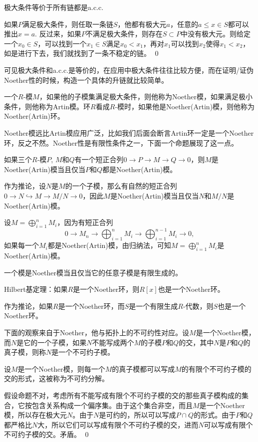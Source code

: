 \pro 极大条件等价于所有链都是a.c.c.

\proof
	如果$P$满足极大条件，则任取一条链$S$，他都有极大元$a$，任意的$a\leq x\in S$都可以推出$x=a$. 反过来，如果$P$不满足极大条件，则存在$S\subset P$中没有极大元。则给定一个$x_0\in S$，可以找到一个$x_1\in S$满足$x_0<x_1$，再对$x_1$可以找到$x_2$使得$x_1<x_2$，如是进行下去，我们就找到了一条不稳定的链。
\qed

可见极大条件和a.c.c.是等价的，在应用中极大条件往往比较方便，而在证明/证伪Noether性的时候，构造一个具体的升链就比较简单。

\para 一个$R$-模$M$，如果他的子模集满足极大条件，则他称为Noether模，如果满足极小条件，则他称为Artin模。环$R$看成$R$-模时，如果他是Noether(Artin)模，则他称为Noether(Artin)环。

Noether模远比Artin模应用广泛，比如我们后面会断言Artin环一定是一个Noether环，反之不然。Noether性是有限性条件之一，下面一个命题展现了这一点。

\pro 如果三个$R$-模$P$, $M$和$Q$有一个短正合列$0\to P\to M\to Q\to 0$，则$M$是Noether(Artin)模当且仅当$P$和$Q$都是Noether(Artin)模。\notprove

作为推论，设$N$是$M$的一个子模，那么有自然的短正合列$0\to N\hookrightarrow M\to M/N\to 0$，因此$M$是Noether(Artin)模当且仅当$N$和$M/N$是Noether(Artin)模。

设$M=\bigoplus_{i=1}^nM_i$，因为有短正合列
\[
	0\to M_n\to \bigoplus_{i=1}^nM_i\to \bigoplus_{i=1}^{n-1}M_i\to 0,
\]
如果每一个$M_i$都是Noether(Artin)模，由归纳法，可知$M=\bigoplus_{i=1}^nM_i$是Noether(Artin)模。

\pro 一个模是Noether模当且仅当它的任意子模是有限生成的。\notprove

\theo Hilbert基定理：如果$R$是一个Noether环，则$R[x]$也是一个Noether环。\notprove

作为推论，如果$R$是一个Noether环，而$S$是一个有限生成$R$-代数，则$S$也是一个Noether环。

\para 下面的观察来自于Noether，他与拓扑上的不可约性对应。设$M$是一个Noether模，而$N$是它的一个子模，如果$N$不能写成两个$M$的子模$P$和$Q$的交，其中$N$是$P$和$Q$的真子模，则称$N$是一个不可约子模。

\pro \label{irrde}设$M$是一个Noether模，则每一个$M$的真子模都可以写成$M$的有限个不可约子模的交的形式，这被称为不可约分解。

\proof
	假设命题不对，考虑所有不能写成有限个不可约子模的交的那些真子模构成的集合，它按包含关系构成一个偏序集。由于这个集合非空，而且$M$是一个Noether模，所以存在极大元$N$。由于$N$是可约的，所以可以写成$P\cap Q$的形式。由于$P$和$Q$都严格比$N$大，所以它们可以写成有限个不可约子模的交，进而$N$可以写成有限个不可约子模的交。矛盾。
\qed

